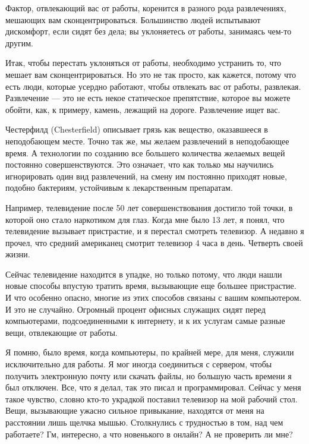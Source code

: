 \documentclass[ebook,12pt,oneside,openany]{memoir}
\author{Пол Грэм} \date{}
\begin{document}
\maketitle

Фактор, отвлекающий вас от работы, коренится в разного рода
развлечениях, мешающих вам сконцентрироваться. Большинство людей
испытывают дискомфорт, если сидят без дела; вы уклоняетесь от работы,
занимаясь чем-то другим.

Итак, чтобы перестать уклоняться от работы, необходимо устранить то,
что мешает вам сконцентрироваться. Но это не так просто, как кажется,
потому что есть люди, которые усердно работают, чтобы отвлекать вас от
работы, развлекая. Развлечение — это не есть некое статическое
препятствие, которое вы можете обойти, как, к примеру, камень, лежащий
на дороге. Развлечение ищет вас.

Честерфилд (Chesterfield) описывает грязь как вещество, оказавшееся в
неподобающем месте. Точно так же, мы желаем развлечений в неподобающее
время. А технологии по созданию все большего количества желаемых вещей
постоянно совершенствуются. Это означает, что как только мы научились
игнорировать один вид развлечений, на смену им постоянно приходят
новые, подобно бактериям, устойчивым к лекарственным препаратам.

Например, телевидение после 50 лет совершенствования достигло той
точки, в которой оно стало наркотиком для глаз. Когда мне было 13 лет,
я понял, что телевидение вызывает пристрастие, и я перестал смотреть
телевизор. А недавно я прочел, что средний американец смотрит
телевизор 4 часа в день. Четверть своей жизни.

Сейчас телевидение находится в упадке, но только потому, что люди
нашли новые способы впустую тратить время, вызывающие еще большее
пристрастие. И что особенно опасно, многие из этих способов связаны с
вашим компьютером. И это не случайно. Огромный процент офисных
служащих сидят перед компьютерами, подсоединенными к интернету, и к их
услугам самые разные вещи, отвлекающие от работы.

Я помню, было время, когда компьютеры, по крайней мере, для меня,
служили исключительно для работы. Я мог иногда соединиться с сервером,
чтобы получить электронную почту или скачать файлы, но большую часть
времени я был отключен. Все, что я делал, так это писал и
программировал. Сейчас у меня такое чувство, словно кто-то украдкой
поставил телевизор на мой рабочий стол. Вещи, вызывающие ужасно
сильное привыкание, находятся от меня на расстоянии лишь щелчка мышью.
Столкнулись с трудностью в том, над чем работаете? Гм, интересно, а
что новенького в онлайн? А не проверить ли мне?
\end{document}
